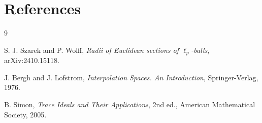 \documentclass[11pt]{article}
\begin{document}
\section*{References}

\begin{thebibliography}{9}

S. J. Szarek and P. Wolff,
\emph{Radii of Euclidean sections of \(\ell_p\)-balls},
arXiv:2410.15118.

J. Bergh and J. Lofstrom,
\emph{Interpolation Spaces. An Introduction},
Springer-Verlag, 1976.

B. Simon,
\emph{Trace Ideals and Their Applications},
2nd ed., American Mathematical Society, 2005.

\end{thebibliography}
\end{document}
